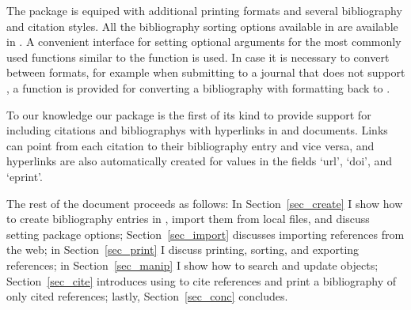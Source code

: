\documentclass[article]{jss}\usepackage[]{graphicx}\usepackage[]{color}
\newcommand{\ourpkg}{\pkg{RefManageR}}
\begin{document}
The package is equiped with additional printing formats and several bibliography and citation styles.  All the bibliography sorting options available in \Biblatex{} are available in \ourpkg{}.  A convenient interface for setting optional arguments for the most commonly used functions similar to the  function is used.  In case it is necessary to convert between formats, for example when submitting to a journal that does not support \Biblatex{}, a function is provided for converting a bibliography with \Biblatex{} formatting back to \Bibtex{}.  

To our knowledge our package is the first of its kind to provide support for including citations and bibliographys with hyperlinks in  and  documents.  Links can point from each citation to their bibliography entry and vice versa, and hyperlinks are also automatically created for values in the \Biblatex{} fields `url', `doi', and `eprint'.

The rest of the document proceeds as follows: In Section~\ref{sec_create} I show how to create bibliography entries in \R{}, import them from local files, and discuss setting package options; Section~\ref{sec_import} discusses importing references from the web; in Section~\ref{sec_print} I discuss printing, sorting, and exporting references; in Section~\ref{sec_manip} I show how to search and update  objects; Section~\ref{sec_cite} introduces using \ourpkg{} to cite references and print a bibliography of only cited references; lastly, Section~\ref{sec_conc} concludes.
% 
\end{document}
